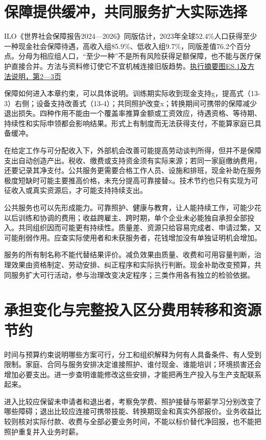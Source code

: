 \documentclass[UTF8,fontset=windows,12pt,a4paper,oneside,openany]{ctexbook}
\begin{document}
\section{保障提供缓冲，共同服务扩大实际选择}

ILO《世界社会保障报告2024—2026》同版估计，2023年全球52.4\%人口获得至少一种现金社会保障待遇，高收入组85.9\%、低收入组9.7\%，同版差值76.2个百分点。分母为相应组人口，“至少一种”不是所有风险获得足额保障，也不能与医疗保护直接合并。方法与资料修订使它不宜机械连接旧版趋势。\href{https://www.ilo.org/sites/default/files/2024-09/SOCPRO_WSPR_2024_Executive_Summary_EN_Web.pdf}{执行摘要图ES.1及方法说明，第2—3页}

保障如何进入本章约束，可以具体说明。训练期实际收到现金支持g，提高式（13-3）右侧；设备支持改善式（13-4）；共同照护改变x；转换期间可携带的保障减少退出损失。四种作用不能由一个覆盖率推算金额或工资效应，待遇资格、等待期、持续性和实际申领都会影响结果。形式上有制度而无法获得支付，不能算家庭已具备缓冲。

在给定工作与可分配收入下，外部机会改善可能提高劳动谈判所得，但并不是保障支出自动创造产出。税收、缴费或支持资金须有实际来源；若同一家庭缴纳费用，还要记录其净支付。公共服务更需要合格工作人员、设施和排班，现金补助在服务极度短缺时可能主要推高价格，未充分提高可靠接替x。技术节约也只有实现为可征收入或真实资源后，才可能支持持续支出。

公共服务也可以先形成能力。可靠照护、健康与教育，让人能持续工作，可能少花以后训练和协调的费用；收益跨雇主、跨时期，单个企业未必能独自承担全部投入。共同组织因而可能更有持续性。质量差、资源只给容易完成者、申请过繁，又可能削弱作用。应查实际使用者和未获服务者，花钱增加没有单独证明机会增加。

服务的所有制名称不能代替结果评价。减负效果由质量、收费和可用容量判断，治理效果由资格制定、劳动安排、纠正程序和实际执行判断。现金补助改变预算，共同服务扩大可行活动，参与治理改变决定程序；三类作用各有独立的检验依据。

\section{承担变化与完整投入区分费用转移和资源节约}

时间与预算约束说明哪些方案可行，分工和组织解释为何有人具备条件、有人受到限制。家庭、合同与服务安排决定谁接照护、谁付现金、谁能培训；环境损害还会增加必要支出。进一步查明谁能修改这些安排，才能把再生产投入与生产支配联系起来。

进入比较应保留未申请者和退出者，考察免学费、照护接替与带薪学习分别改变了哪些障碍；退出比较应连接可携带技能、转换期现金和真实外部报价。业务收益比较则核对实际付款、收费与全部必要业务时间，不能以标价替代净回报，也不能把照护重复并入业务时薪。
\end{document}

